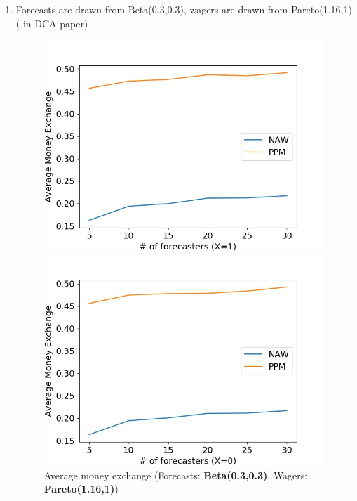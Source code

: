 \documentclass[english,10pt]{article}
\begin{document}
\begin{enumerate}
	\item Forecasts are drawn from Beta(0.3,0.3), wagers are drawn from Pareto(1.16,1) ( in DCA paper)
	\begin{figure}[H]
        	\centering
        	\begin{minipage}{0.48\textwidth}
        	\includegraphics[width = \textwidth]{(Beta(0dot3_0dot3)F_Pareto(1dot16_1)W)Avg_MnEx(X=1).jpg}
        	\end{minipage}
        	\begin{minipage}{0.48\textwidth}
        	\includegraphics[width = \textwidth]{(Beta(0dot3_0dot3)F_Pareto(1dot16_1)W)Avg_MnEx(X=0).jpg}
        	\end{minipage}
        	\caption{Average money exchange (Forecasts: \textbf{Beta(0.3,0.3)}, Wagers: \textbf{Pareto(1.16,1)})}
        	\end{figure}
	

\end{enumerate}
\end{document}
